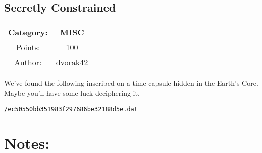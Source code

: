 \begin{center}
\section*{Secretly Constrained}
{\large
\begin{tabular}{| c c |}
\hline
Category: & MISC\\\hline
Points: & 100\\\hline
Author: & dvorak42\\\hline
\end{tabular}
}
\end{center}
\vspace{0.5in}

{\large
We've found the following inscribed on a time capsule hidden in the Earth's Core. Maybe you'll have some luck deciphering it.
}
\vspace{0.25in}
\begin{center}
  {\Large\tt /ec50550bb351983f297686be32188d5e.dat}
\end{center}

\vspace{0.25in}
\section*{Notes:}
